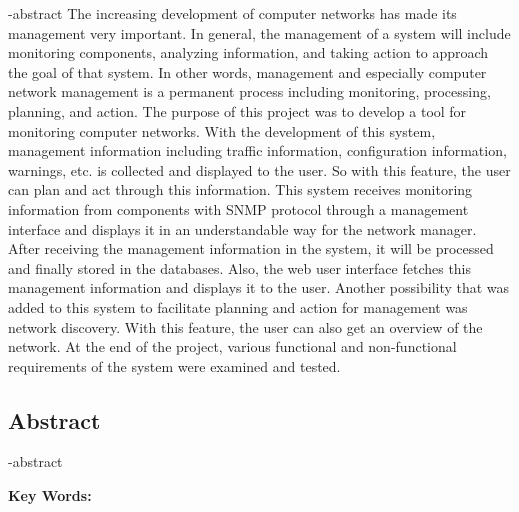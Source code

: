 
\en-abstract{
    The increasing development of computer networks has made its management very important. In general, the management of a system will include monitoring components, analyzing information, and taking action to approach the goal of that system. In other words, management and especially computer network management is a permanent process including monitoring, processing, planning, and action. The purpose of this project was to develop a tool for monitoring computer networks. With the development of this system, management information including traffic information, configuration information, warnings, etc. is collected and displayed to the user. So with this feature, the user can plan and act through this information. This system receives monitoring information from components with SNMP protocol through a management interface and displays it in an understandable way for the network manager. After receiving the management information in the system, it will be processed and finally stored in the databases. Also, the web user interface fetches this management information and displays it to the user. Another possibility that was added to this system to facilitate planning and action for management was network discovery. With this feature, the user can also get an overview of the network. At the end of the project, various functional and non-functional requirements of the system were examined and tested.
}

\newpage
\thispagestyle{empty}
\begin{latin}
\section*{\LARGE\centering Abstract}

\een-abstract

\vspace*{.5cm}
{\large\textbf{Key Words:}}\par
\vspace*{.5cm}
\elatinkeywords
\end{latin}